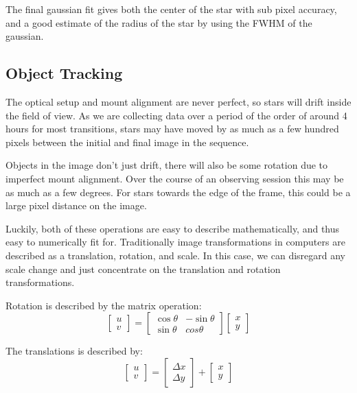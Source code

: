 The final gaussian fit gives both the center of the star with sub pixel accuracy, and a good estimate of the radius of the star by using the FWHM of the gaussian.

\subsection{Object Tracking}

The optical setup and mount alignment are never perfect, so stars will drift inside the field of view. As we are collecting data over a period of the order of around 4 hours for most transitions, stars may have moved by as much as a few hundred pixels between the initial and final image in the sequence.

Objects in the image don't just drift, there will also be some rotation due to imperfect mount alignment. Over the course of an observing session this may be as much as a few degrees. For stars towards the edge of the frame, this could be a large pixel distance on the image.

Luckily, both of these operations are easy to describe mathematically, and thus easy to numerically fit for. Traditionally image transformations in computers are described as a translation, rotation, and scale. In this case, we can disregard any scale change and just concentrate on the translation and rotation transformations.

Rotation is described by the matrix operation:
\[
\begin{bmatrix}
    u \\ v
\end{bmatrix}
=
\begin{bmatrix}
\cos\theta & -\sin\theta \\
\sin\theta & cos\theta
\end{bmatrix}
\begin{bmatrix}
    x \\ y
\end{bmatrix}
\]

The translations is described by:
\[
\begin{bmatrix}
    u \\ v
\end{bmatrix}
=
\begin{bmatrix}
    \Delta x \\ \Delta y
\end{bmatrix} +
\begin{bmatrix}
    x \\ y
\end{bmatrix}
\]

